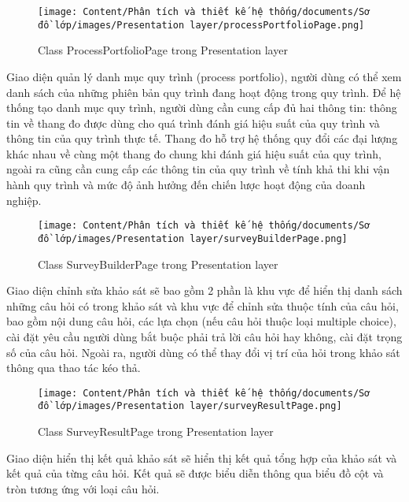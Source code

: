\begin{figure}[H]
    \centering
    \texttt{[image: Content/Phân tích và thiết kế hệ thống/documents/Sơ đồ lớp/images/Presentation layer/processPortfolioPage.png]}
    \vspace{0.5cm}
    \caption{Class ProcessPortfolioPage trong Presentation layer}
    \label{fig:Class ProcessPortfolioPage trong Presentation layer}
\end{figure}
Giao diện quản lý danh mục quy trình (process portfolio), người dùng có thể xem danh sách của những phiên bản quy trình đang hoạt động trong quy trình. Để hệ thống tạo danh mục quy trình, người dùng cần cung cấp đủ hai thông tin: thông tin về thang đo được dùng cho quá trình đánh giá hiệu suất của quy trình và thông tin của quy trình thực tế. Thang đo hỗ trợ hệ thống quy đổi các đại lượng khác nhau về cùng một thang đo chung khi đánh giá hiệu suất của quy trình, ngoài ra cũng cần cung cấp các thông tin của quy trình về tính khả thi khi vận hành quy trình và mức độ ảnh hưởng đến chiến lược hoạt động của doanh nghiệp.

\begin{figure}[H]
    \centering
    \texttt{[image: Content/Phân tích và thiết kế hệ thống/documents/Sơ đồ lớp/images/Presentation layer/surveyBuilderPage.png]}
    \vspace{0.5cm}
    \caption{Class SurveyBuilderPage trong Presentation layer}
    \label{fig:Class SurveyBuilderPage trong Presentation layer}
\end{figure}
Giao diện chỉnh sửa khảo sát sẽ bao gồm 2 phần là khu vực để hiển thị danh sách những câu hỏi có trong khảo sát và khu vực để chỉnh sửa thuộc tính của câu hỏi, bao gồm nội dung câu hỏi, các lựa chọn (nếu câu hỏi thuộc loại multiple choice), cài đặt yêu cầu người dùng bắt buộc phải trả lời câu hỏi hay không, cài đặt trọng số của câu hỏi. Ngoài ra, người dùng có thể thay đổi vị trí của hỏi trong khảo sát thông qua thao tác kéo thả.

\begin{figure}[H]
    \centering
    \texttt{[image: Content/Phân tích và thiết kế hệ thống/documents/Sơ đồ lớp/images/Presentation layer/surveyResultPage.png]}
    \vspace{0.5cm}
    \caption{Class SurveyResultPage trong Presentation layer}
    \label{fig:Class SurveyResultPage trong Presentation layer}
\end{figure}
Giao diện hiển thị kết quả khảo sát sẽ hiển thị kết quả tổng hợp của khảo sát và kết quả của từng câu hỏi. Kết quả sẽ được biểu diễn thông qua biểu đồ cột và tròn tương ứng với loại câu hỏi.

